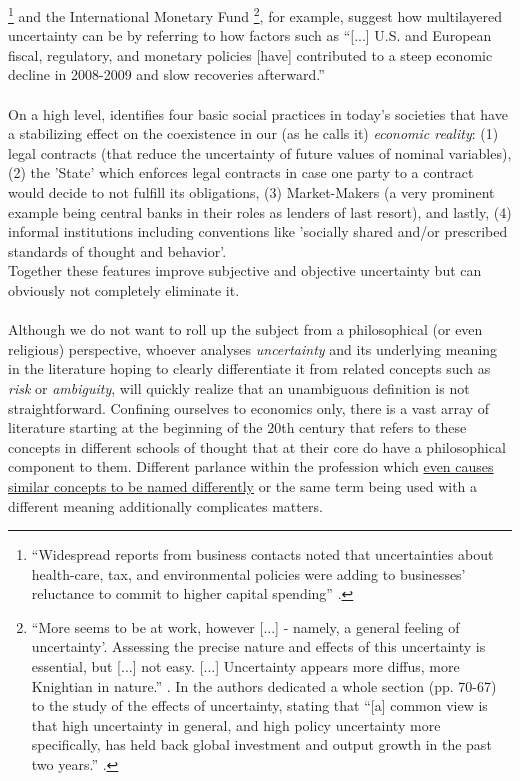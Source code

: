 \documentclass[a4paper,11pt,listof=nochaptergap,oneside,pointednumbers,bibtotoc,bigheadings,liststotoc]{scrbook}
\begin{document}
\citet{FOMC:09}\footnote{``Widespread reports from business contacts noted that uncertainties about health-care, tax, and environmental policies were adding to businesses' reluctance to commit to higher capital spending'' \citep{FOMC:09}.} and the International Monetary Fund \citep{IMF:12, IMF:13}\footnote{``More seems to be at work, however [...] - namely, a general feeling of uncertainty'. Assessing the precise nature and effects of this uncertainty is essential, but [...] not easy. [...] Uncertainty appears more diffus, more Knightian in nature.'' \citep{IMF:12}. In \citet{IMF:13} the authors dedicated a whole section (pp. 70-67) to the study of the effects of uncertainty, stating that ``[a] common view is that high uncertainty in general, and high policy uncertainty more specifically, has held back global investment and output growth in the past two years.'' \citep[p. 70]{IMF:13}.}, for example, suggest how multilayered uncertainty can be by referring to how factors such as ``[...] U.S. and European fiscal, regulatory, and monetary policies [have] contributed to a steep economic decline in 2008-2009 and slow recoveries afterward.'' \citep[p.1594]{bakeretal:15}
\\
\\
On a high level, \citet{dequesh:00} identifies four basic social practices in today's societies that have a stabilizing effect on the coexistence in our (as  he calls it) \textit{economic reality}: (1) legal contracts (that reduce the uncertainty of future values of nominal variables), (2) the 'State' which enforces legal contracts in case one party to a contract would decide to not fulfill its obligations, (3) Market-Makers (a very prominent example being central banks in their roles as lenders of last resort), and lastly, (4) informal institutions including conventions like 'socially shared and/or prescribed standards of thought and behavior'. \\
Together these features improve subjective and objective uncertainty but can obviously not completely eliminate it. \\
\\
Although we do not want to roll up the subject from a philosophical (or even religious) perspective, whoever analyses \textit{uncertainty} and its underlying meaning in the literature hoping to clearly differentiate it from related concepts such as \textit{risk} or \textit{ambiguity}, will quickly realize that an unambiguous definition is not straightforward. Confining ourselves to economics only, there is a vast array of literature starting at the beginning of the 20th century that refers to these concepts in different schools of thought that at their core do have a philosophical component to them. Different parlance within the profession which \href{http://www.economics-ejournal.org/economics/discussionpapers/2015-36/file}{even causes similar concepts to be named differently} or the same term being used with a different meaning additionally complicates matters.\\
\end{document}
